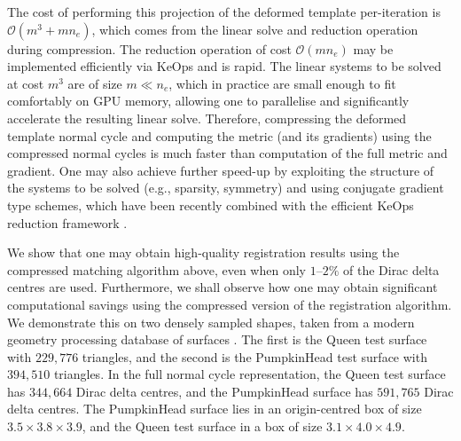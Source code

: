 \documentclass[sn-mathphys-num]{sn-jnl}%
\theoremstyle{thmstyleone}%
\theoremstyle{thmstyletwo}%
\theoremstyle{thmstylethree}%
\numberwithin{remark}{section}
\numberwithin{definition}{section}
\numberwithin{equation}{section}
\numberwithin{theorem}{section}
\begin{document}
The cost of performing this projection of the deformed template per-iteration is $\mathcal{O}(m^{3} + mn_{e})$, which comes from the linear solve and reduction operation during compression. The reduction operation of cost $\mathcal{O}(mn_{e})$ may be implemented efficiently via KeOps and is rapid. The linear systems to be solved at cost $m^{3}$ are of size $m\ll n_{e}$, which in practice are small enough to fit comfortably on GPU memory, allowing one to parallelise and significantly accelerate the resulting linear solve. Therefore, compressing the deformed template normal cycle and computing the metric (and its gradients) using the compressed normal cycles is much faster than computation of the full metric and gradient. One may also achieve further speed-up by exploiting the structure of the systems to be solved (e.g., sparsity, symmetry) and using conjugate gradient type schemes, which have been recently combined with the efficient KeOps reduction framework \cite{Keops}.


 




We show that one may obtain high-quality registration results using the compressed matching algorithm above, even when only $1$--$2\%$ of the Dirac delta centres are used. Furthermore, we shall observe how one may obtain significant computational savings using the compressed version of the registration algorithm. We demonstrate this on two  densely sampled shapes, taken from a modern geometry processing database of surfaces \cite{Thingi10k}. The first is the Queen test surface with  {$229,776$} triangles, and the second is the PumpkinHead test surface with  {$394,510$} triangles. In the full normal cycle representation, the Queen test surface has $344,664$ Dirac delta centres, and the PumpkinHead surface has $591,765$ Dirac delta centres. The PumpkinHead surface lies in an origin-centred box of size $3.5\times 3.8 \times 3.9$, and the Queen test surface in a box of size $3.1 \times 4.0 \times 4.9$. 
\end{document}
